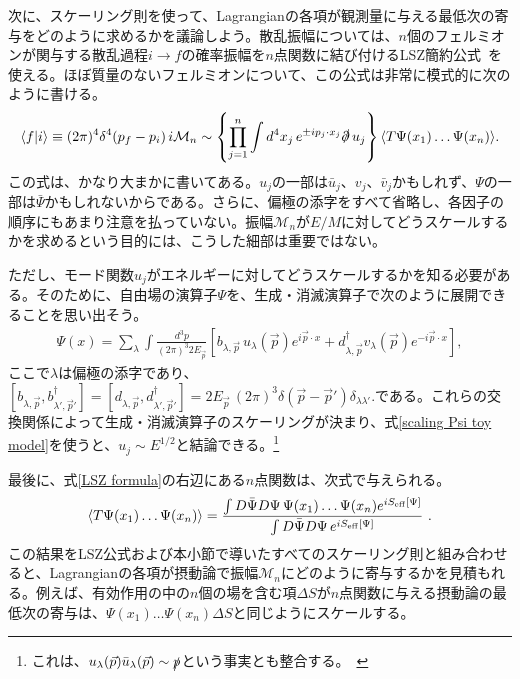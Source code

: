 次に、スケーリング則を使って、Lagrangianの各項が観測量に与える最低次の寄与をどのように求めるかを議論しよう。散乱振幅については、$n$個のフェルミオンが関与する散乱過程$i \to f$の確率振幅を$n$点関数に結び付けるLSZ簡約公式~\cite{Srednicki:2007ab}を使える。ほぼ質量のないフェルミオンについて、この公式は非常に模式的に次のように書ける。
%
\begin{align} \label{LSZ formula}
	\langle f | i \rangle \equiv (2 \pi)^4 \delta^4 (p_f - p_i) \, i \mathcal{M}_n \sim \left\{ \prod_{j=1}^n \int d^4 x_j \, e^{\pm i p_j \cdot x_j} \slashed{\partial} \, u_j \right\} \langle T \Psi (x_1) \dots \Psi (x_n) \rangle .
\end{align}
% 
この式は、かなり大まかに書いてある。$u_j$の一部は$\bar u_j$、$v_j$、$\bar v_j$かもしれず、$\Psi$の一部は$\bar \Psi$かもしれないからである。さらに、偏極の添字をすべて省略し、各因子の順序にもあまり注意を払っていない。振幅$\mathcal M_n$が$E/M$に対してどうスケールするかを求めるという目的には、こうした細部は重要ではない。

ただし、モード関数$u_j$がエネルギーに対してどうスケールするかを知る必要がある。そのために、自由場の演算子$\Psi$を、生成・消滅演算子で次のように展開できることを思い出そう。
%
\begin{align}
	\Psi (x) = \sum_\lambda \int \frac{ d^3 p}{(2 \pi)^3 2 E_{\vec p}} \left[ b_{\lambda, \vec p} \, u_\lambda (\vec p) e^{i \vec p \cdot x} + d^\dag_{\lambda, \vec p} v_\lambda (\vec p) e^{-i \vec p \cdot x} \right] ,
\end{align}
%
ここで$\lambda$は偏極の添字であり、$[ b_{\lambda, \vec p}, b^\dag_{\lambda', \vec p'} ] = [ d_{\lambda, \vec p}, d^\dag_{\lambda', \vec p'} ] = 2 E_{\vec p} \, (2\pi)^3 \delta (\vec p - \vec p') \delta_{\lambda \lambda'}.$である。これらの交換関係によって生成・消滅演算子のスケーリングが決まり、式\eqref{scaling Psi toy model}を使うと、$u_j \sim E^{1/2}$と結論できる。\footnote{これは、$u_\lambda (\vec p) \bar u_\lambda (\vec p) \sim \slashed{p}$という事実とも整合する。~\cite{Srednicki:2007ab}}

最後に、式\eqref{LSZ formula}の右辺にある$n$点関数は、次式で与えられる。
%
\begin{align} \label{expectation values}
	\langle T \Psi (x_1) \dots \Psi (x_n) \rangle = \frac{\int  D \bar \Psi D \Psi \, \Psi (x_1) \dots \Psi (x_n) e^{i S_{\rm eff} [\Psi]}}{\int  D \bar \Psi D \Psi \, e^{i S_{\rm eff} [\Psi]}} \ .
\end{align}
%
この結果をLSZ公式および本小節で導いたすべてのスケーリング則と組み合わせると、Lagrangianの各項が摂動論で振幅$\mathcal M_n$にどのように寄与するかを見積もれる。例えば、有効作用の中の$n$個の場を含む項$\Delta S$が$n$点関数に与える摂動論の最低次の寄与は、$\Psi (x_1) \dots \Psi (x_n) \Delta S$と同じようにスケールする。

